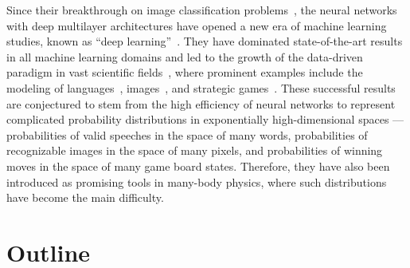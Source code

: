 Since their breakthrough on image classification problems~\cite{krizhevsky2012imagenet}, the neural networks with deep multilayer architectures have opened a new era of machine learning studies, known as ``deep learning''~\cite{goodfellow2016deep}. They have dominated state-of-the-art results in all machine learning domains and led to the growth of the data-driven paradigm in vast scientific fields~\cite{montans2019data}, where prominent examples include the modeling of languages~\cite{brown2020language}, images~\cite{rombach2022high}, and strategic games~\cite{silver2016mastering}. These successful results are conjectured to stem from the high efficiency of neural networks to represent complicated probability distributions in exponentially high-dimensional spaces --- probabilities of valid speeches in the space of many words, probabilities of recognizable images in the space of many pixels, and probabilities of winning moves in the space of many game board states. Therefore, they have also been introduced as promising tools in many-body physics, where such distributions have become the main difficulty.

\section{Outline}

